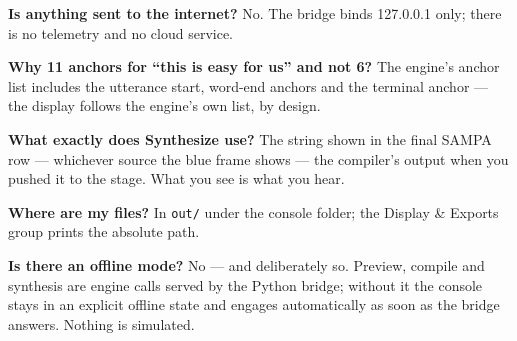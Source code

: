 \documentclass[11pt,a4paper]{article}
\begin{document}
\textbf{Is anything sent to the internet?} No. The bridge binds
127.0.0.1 only; there is no telemetry and no cloud service.

\textbf{Why 11 anchors for ``this is easy for us'' and not 6?} The
engine's anchor list includes the utterance start, word-end anchors and
the terminal anchor --- the display follows the engine's own list, by
design.

\textbf{What exactly does Synthesize use?} The string shown in the final
SAMPA row --- whichever source the blue frame shows ---
the compiler's output when you pushed it to the stage. What you see is
what you hear.

\textbf{Where are my files?} In \texttt{out/} under the console folder;
the Display \& Exports group prints the absolute path.

\textbf{Is there an offline mode?} No --- and deliberately so.
Preview, compile and synthesis are engine calls served by the Python
bridge; without it the console stays in an explicit offline state and
engages automatically as soon as the bridge answers. Nothing is
simulated.
\end{document}
